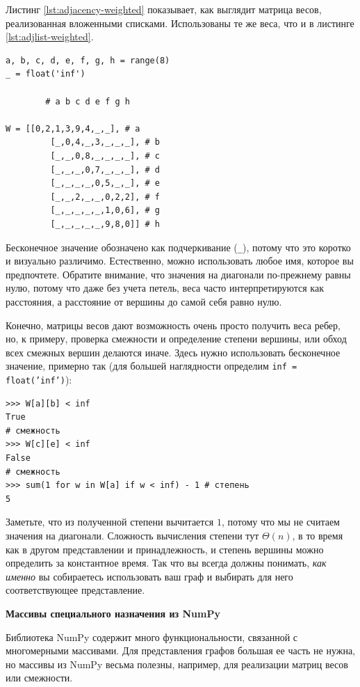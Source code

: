 Листинг \ref{lst:adjacency-weighted} показывает, как выглядит матрица весов, реализованная вложенными списками. Использованы те же веса, что и в листинге \ref{lst:adjlist-weighted}.

\begin{lstlisting}[caption={Матрица весов с бесконечными значениями для отсутствующих ребер}, label={lst:adjacency-weighted}]
a, b, c, d, e, f, g, h = range(8)
_ = float('inf')

		# a b c d e f g h

W = [[0,2,1,3,9,4,_,_], # a
	 	 [_,0,4,_,3,_,_,_], # b
		 [_,_,0,8,_,_,_,_], # c
		 [_,_,_,0,7,_,_,_], # d
		 [_,_,_,_,0,5,_,_], # e
		 [_,_,2,_,_,0,2,2], # f
		 [_,_,_,_,_,1,0,6], # g
		 [_,_,_,_,_,9,8,0]] # h
\end{lstlisting}

Бесконечное значение обозначено как подчеркивание (\texttt{\_}), потому что это коротко и визуально различимо. Естественно, можно использовать любое имя, которое вы предпочтете. Обратите внимание, что значения на диагонали по-прежнему равны нулю, потому что даже без учета петель, веса часто интерпретируются как расстояния, а расстояние от вершины до самой себя равно нулю.

Конечно, матрицы весов дают возможность очень просто получить веса ребер, но, к примеру, проверка смежности и определение степени вершины, или обход всех смежных вершин делаются иначе. Здесь нужно использовать бесконечное значение, примерно так (для большей наглядности определим \texttt{inf = float('inf')}):
\begin{lstlisting}
>>> W[a][b] < inf
True
# смежность
>>> W[c][e] < inf
False
# смежность
>>> sum(1 for w in W[a] if w < inf) - 1 # степень
5
\end{lstlisting}

Заметьте, что из полученной степени вычитается $1$, потому что мы не считаем значения на диагонали. Сложность вычисления степени тут $\Theta(n)$, в то время как в другом представлении и принадлежность, и степень вершины можно определить за константное время. Так что  вы всегда должны понимать, \textit{как именно} вы собираетесь использовать ваш граф и выбирать для него соответствующее представление.

\textbf{Массивы специального назначения из NumPy}

Библиотека NumPy содержит много функциональности, связанной с многомерными массивами. Для представления графов большая ее часть не нужна, но массивы из NumPy весьма полезны, например, для реализации матриц весов или смежности.

